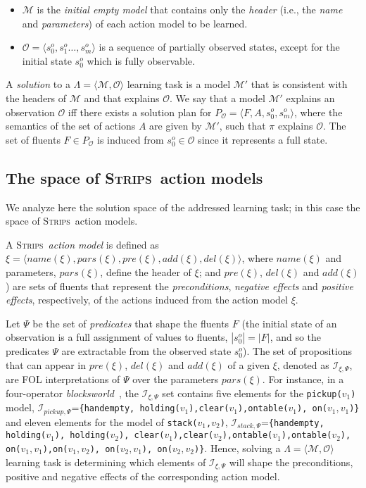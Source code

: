 \documentclass[runningheads]{llncs}
\newcommand{\tup}[1]{{\langle #1 \rangle}}
\newcommand{\strips}{\textsc{Strips}}     %
\begin{document}
\begin{itemize}
\item $\mathcal{M}$ is the {\em initial empty model} that contains only the {\em header} (i.e., the {\em name} and {\em parameters}) of each action model to be learned.
\item $\mathcal{O}=\tup{s_0^o,s_1^o \ldots , s_m^o}$ is a sequence of partially observed states, except for the initial state $s_0^o$ which is fully observable.
\end{itemize}

A {\em solution} to a $\Lambda=\tup{\mathcal{M},{\mathcal O}}$ learning task is a model $\mathcal{M}'$ that is consistent with the headers of $\mathcal{M}$ and that explains $\mathcal{O}$. We say that a model $\mathcal{M}'$ explains an observation $\mathcal{O}$ iff there exists a solution plan for $P_\mathcal{O}=\tup{F,A,s_0^o,s_m^o}$, where the semantics of the set of actions $A$ are given by $\mathcal{M}'$, such that $\pi$ explains $\mathcal{O}$. The set of fluents $F\in P_\mathcal{O}$ is induced from $s_0^o\in \mathcal{O}$ since it represents a full state.

\subsection{The space of \strips\ action models}
\label{sec:strips-space}
We analyze here the solution space of the addressed learning task; in this case the space of \strips\ action models.

A \strips\ \emph{action model} is defined as $\xi=\tup{name(\xi),pars(\xi),pre(\xi),add(\xi),del(\xi)}$, where $name(\xi)$ and parameters, $pars(\xi)$, define the header of $\xi$; and $pre(\xi)$, $del(\xi)$ and $add(\xi)$) are sets of fluents that represent the {\em preconditions}, {\em negative effects} and {\em positive effects}, respectively, of the actions induced from the action model $\xi$.

Let $\Psi$ be the set of {\em predicates} that shape the fluents $F$ (the initial state of an observation is a full assignment of values to fluents, $|s_0^o|=|F|$, and so the predicates $\Psi$ are extractable from the observed state $s_0^o$). The set of propositions that can appear in $pre(\xi)$, $del(\xi)$ and $add(\xi)$ of a given $\xi$, denoted as ${\mathcal I}_{\xi,\Psi}$, are FOL interpretations of $\Psi$ over the parameters $pars(\xi)$. For instance, in a four-operator {\em blocksworld}~\cite{slaney2001blocks}, the ${\mathcal I}_{\xi,\Psi}$ set contains five elements for the {\small \tt pickup($v_1$)} model, ${\mathcal I}_{pickup,\Psi}$={\small\tt\{handempty, holding($v_1$),clear($v_1$),ontable($v_1$), on($v_1,v_1$)\}} and eleven elements for the model of {\small \tt stack($v_1$,$v_2$)}, ${\mathcal I}_{stack,\Psi}$={\small\tt\{handempty, holding($v_1$), holding($v_2$), clear($v_1$),clear($v_2$),ontable($v_1$),ontable($v_2$), on($v_1,v_1$),on($v_1,v_2$), on($v_2,v_1$), on($v_2,v_2$)\}}. Hence, solving a $\Lambda=\tup{\mathcal{M},{\mathcal O}}$ learning task is determining which elements of ${\mathcal I}_{\xi,\Psi}$ will shape the preconditions, positive and negative effects of the corresponding action model.
\end{document}
